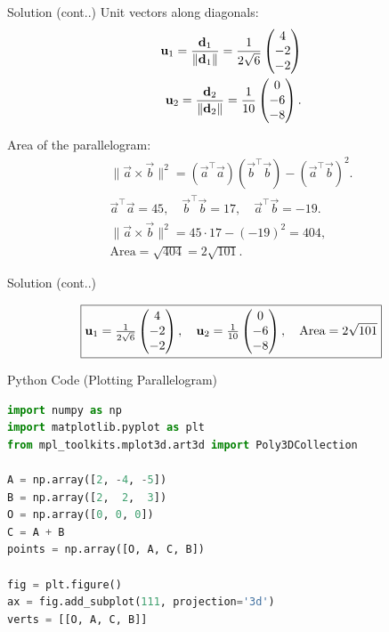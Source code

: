 \documentclass{beamer}
\begin{document}
\begin{frame}{Solution (cont..)}
Unit vectors along diagonals:
\begin{align}
\mathbf{u}_1 = \frac{\mathbf{d}_1}{\|\mathbf{d}_1\|}
= \frac{1}{2\sqrt{6}}\begin{pmatrix}4 \\ -2 \\ -2\end{pmatrix} \\
\mathbf{u}_2 = \frac{\mathbf{d}_2}{\|\mathbf{d}_2\|} 
= \frac{1}{10}\begin{pmatrix}0 \\ -6 \\ -8\end{pmatrix}.
\end{align}

Area of the parallelogram:
\begin{align}
\|\vec{a}\times\vec{b}\|^2 
= (\vec{a}^\top\vec{a})(\vec{b}^\top\vec{b}) - (\vec{a}^\top\vec{b})^2.
\\\vec{a}^\top\vec{a} = 45, 
\quad 
\vec{b}^\top\vec{b} = 17, 
\quad 
\vec{a}^\top\vec{b} = -19.
\\
\|\vec{a}\times\vec{b}\|^2 = 45 \cdot 17 - (-19)^2 = 404,
\\
\text{Area} = \sqrt{404} = 2\sqrt{101}.
\end{align}
\end{frame}

\begin{frame}{Solution (cont..)}


\begin{align*}
\boxed{\mathbf{u}_1 = \tfrac{1}{2\sqrt{6}}\begin{pmatrix}4 \\ -2 \\ -2\end{pmatrix}, 
\quad 
\mathbf{u}_2 = \tfrac{1}{10}\begin{pmatrix}0 \\ -6 \\ -8\end{pmatrix}, 
\quad 
\text{Area} = 2\sqrt{101}}
\end{align*}
\end{frame}

\begin{frame}[fragile]{Python Code (Plotting Parallelogram)}
\begin{lstlisting}[language=Python]
import numpy as np
import matplotlib.pyplot as plt
from mpl_toolkits.mplot3d.art3d import Poly3DCollection

A = np.array([2, -4, -5])
B = np.array([2,  2,  3])
O = np.array([0, 0, 0])
C = A + B
points = np.array([O, A, C, B])

fig = plt.figure()
ax = fig.add_subplot(111, projection='3d')
verts = [[O, A, C, B]]

\end{lstlisting}
\end{frame}
\end{document}
